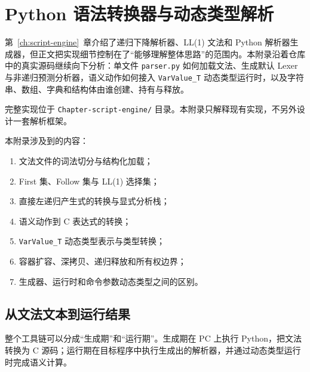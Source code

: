 \chapter{Python 语法转换器与动态类型解析} \label{app:parser-generator-runtime}

第~\ref{ch:script-engine}~章介绍了递归下降解析器、LL(1) 文法和 Python 解析器生成器，但正文把实现细节控制在了“能够理解整体思路”的范围内。本附录沿着仓库中的真实源码继续向下分析：单文件 \texttt{parser.py} 如何加载文法、生成默认 Lexer 与非递归预测分析器，语义动作如何接入 \texttt{VarValue\_T} 动态类型运行时，以及字符串、数组、字典和结构体由谁创建、持有与释放。

完整实现位于 \texttt{Chapter-script-engine/} 目录。本附录只解释现有实现，不另外设计一套解析框架。

\medskip 本附录涉及到的内容：
\begin{enumerate}
\item 文法文件的词法切分与结构化加载；
\item First 集、Follow 集与 LL(1) 选择集；
\item 直接左递归产生式的转换与显式分析栈；
\item 语义动作到 C 表达式的转换；
\item \texttt{VarValue\_T} 动态类型表示与类型转换；
\item 容器扩容、深拷贝、递归释放和所有权边界；
\item 生成器、运行时和命令参数动态类型之间的区别。
\end{enumerate}

\section{从文法文本到运行结果}

整个工具链可以分成“生成期”和“运行期”。生成期在 PC 上执行 Python，把文法转换为 C 源码；运行期在目标程序中执行生成出的解析器，并通过动态类型运行时完成语义计算。

